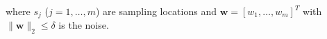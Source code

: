 \documentclass[a0paper,portrait,fontscale=0.35]{baposter}
\newcommand{\mycaption}[1]{
  {
    \smaller
    \emph{#1}
  }
}
\theoremstyle{plain}
\theoremstyle{plain}
\theoremstyle{definition}
\theoremstyle{plain}
\theoremstyle{definition}
\begin{document}
\begin{poster}
{\begin{minipage}[t]{\textwidth}
\begin{minipage}[t]{0.49\textwidth}
\begin{minipage}[t]{\textwidth}
      \end{minipage}

      \begin{center}
      \end{center}
      {\smaller where $s_j$ ($j=1,\ldots,m$) are sampling locations
      and $\mathbf{w} = [w_1,\ldots,w_m]^T$ with $\|\mathbf{w}\|_2 \leq \delta$
      is the noise.}

    \end{minipage}
  \end{minipage}
}
\end{poster}
\end{document}
